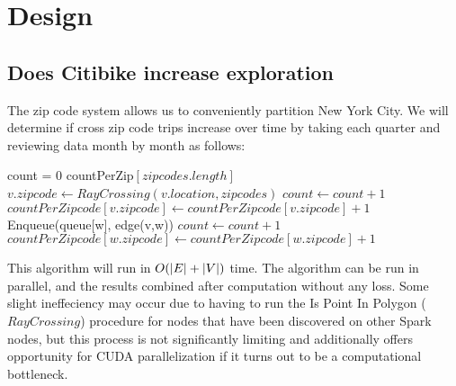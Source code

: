 \documentclass{article}
\DeclarePairedDelimiter{\abs}{\lvert}{\rvert}
\begin{document}
\section{Design}
\subsection{Does Citibike increase exploration}
The zip code system allows us to conveniently partition New York City. We will determine if cross zip code trips increase over time by taking each quarter and reviewing data month by month as follows:
\begin{algorithmic}[1]
	\State count = 0
	\State countPerZip$[zipcodes.length]$
		\State $v.zipcode \gets RayCrossing(v.location, zipcodes)$
					\State $count \gets count + 1$
					\State $countPerZipcode[v.zipcode] \gets countPerZipcode[v.zipcode] + 1$
				\EndIf
			\Else
				\State Enqueue(queue[w], edge(v,w))
			\EndIf
		\EndFor
				\State $count \gets count + 1$
				\State $countPerZipcode[w.zipcode] \gets countPerZipcode[w.zipcode] + 1$
			\EndIf
		\EndFor
	\EndFor
\EndProcedure
\end{algorithmic}

This algorithm will run in $O(\abs{E} + \abs{V})$ time. The algorithm can be run in parallel, and the results combined after computation without any loss. Some slight ineffeciency may occur due to having to run the Is Point In Polygon ($RayCrossing$) procedure for nodes that have been discovered on other Spark nodes, but this process is not significantly limiting and additionally offers opportunity for CUDA parallelization if it turns out to be a computational bottleneck.
\end{document}
